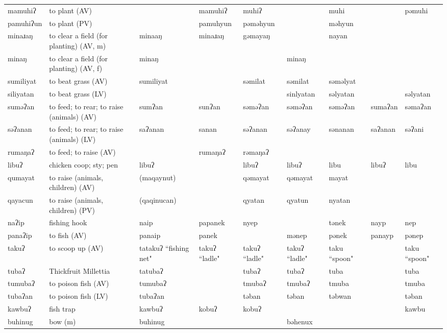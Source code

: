 \begin{landscape}
\begin{longtable}{*{9}{>{\raggedright\arraybackslash}p{}}}
\text{*}mamuhiʔ & to plant (AV) &  & mamuhiʔ & muhiʔ &  & muhi &  & pəmuhi\\
\text{*}pamuhiʔun & to plant (PV) &  & pamuhyun & pəməhyun &  & məhyun &  & \\
\text{*}minaɹaŋ & to clear a field (for planting) (AV, m) & minaaŋ & minaɹaŋ & gəmayaŋ &  & nayan &  & \\
\text{*}minaŋ & to clear a field (for planting) (AV, f) & minaŋ &  &  & minaŋ &  &  & \\
\text{*}sumiliyat & to beat grass (AV) & sumiliyat &  & səmilat & səmilat & səməlyat &  & \\
\text{*}siliyatan & to beat grass (LV) &  &  &  & sinlyatan & səlyatan &  & səlyatan\\
\text{*}suməʔan & to feed; to rear; to raise (animals) (AV) & sumʔan & sunʔan & səməʔan & səməʔan & səməʔan & sumaʔan & səmaʔan\\
\text{*}səʔanan & to feed; to rear; to raise (animals) (LV) & saʔanan & sanan & səʔanan & səʔanay & sənanan & saʔanan & səʔani\\
\text{*}rumaŋaʔ & to feed; to raise (AV) &  & rumaŋaʔ & rəmaŋaʔ &  &  &  & \\
\text{*}libuʔ & chicken coop; sty; pen & libuʔ &  & libuʔ & libuʔ & libu & libuʔ & libu\\
\text{*}qumayat & to raise (animals, children) (AV) & (maqaynut) &  & qəmayat & qəmayat & mayat &  & \\
\text{*}qayacun & to raise (animals, children) (PV) & (qaqinucan) &  & qyatan & qyatun & nyatan &  & \\
\text{*}naʔip & fishing hook & naip & papanek & nyep &  & tənek & nayp & nep\\
\text{*}panaʔip & to fish (AV) & panaip & panek &  & mənep & pənek & panayp & pənep\\
\text{*}takuʔ & to scoop up (AV) & tatakuʔ ``fishing net" & takuʔ ``ladle" & takuʔ ``ladle" & takuʔ ``ladle" & taku ``spoon" &  & taku ``spoon"\\
\text{*}tubaʔ & Thickfruit Millettia & tatubaʔ &  & tubaʔ & tubaʔ & tuba &  & tuba\\
\text{*}tumubaʔ & to poison fish (AV) & tumubaʔ &  & tmubaʔ & tmubaʔ & tmuba &  & tmuba\\
\text{*}tubaʔan & to poison fish (LV) & tubaʔan &  & təban & təban & təbwan &  & təban\\
\text{*}kawbuʔ & fish trap & kawbuʔ & kobuʔ & kobuʔ &  &  &  & kawbu\\
\text{*}buhinug & bow (m) & buhinug &  &  & bəhenux &  &  & \\

\end{longtable}
\end{landscape}
